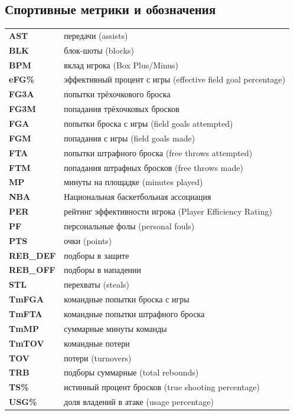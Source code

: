 
\subsection*{Спортивные метрики и обозначения}

\noindent
\begin{tabular}{@{}>{\bfseries}p{2.6cm}Y{12.7cm}@{}}
AST   & передачи (assists) \\
BLK   & блок-шоты (blocks) \\
BPM   & вклад игрока (Box Plus/Minus) \\
eFG\% & эффективный процент с игры (effective field goal percentage) \\
FG3A  & попытки трёхочкового броска \\
FG3M  & попадания трёхочковых бросков \\
FGA   & попытки броска с игры (field goals attempted) \\
FGM   & попадания с игры (field goals made) \\
FTA   & попытки штрафного броска (free throws attempted) \\
FTM   & попадания штрафных бросков (free throws made) \\
MP    & минуты на площадке (minutes played) \\
NBA   & Национальная баскетбольная ассоциация \\
PER   & рейтинг эффективности игрока (Player Efficiency Rating) \\
PF    & персональные фолы (personal fouls) \\
PTS   & очки (points) \\
REB\_DEF & подборы в защите \\
REB\_OFF & подборы в нападении \\
STL   & перехваты (steals) \\
TmFGA & командные попытки броска с игры \\
TmFTA & командные попытки штрафного броска \\
TmMP  & суммарные минуты команды \\
TmTOV & командные потери \\
TOV   & потери (turnovers) \\
TRB   & подборы суммарные (total rebounds) \\
TS\%  & истинный процент бросков (true shooting percentage) \\
USG\% & доля владений в атаке (usage percentage) \\
\end{tabular}

